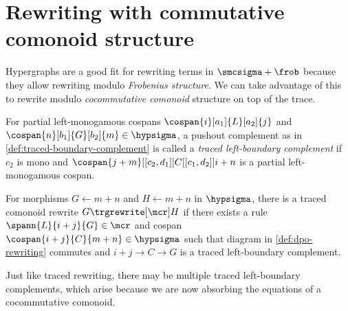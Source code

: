 \section{Rewriting with commutative comonoid structure}

Hypergraphs are a good fit for rewriting terms in
\(\smcsigma + \frob\) because they allow rewriting modulo
\emph{Frobenius structure}.
We can take advantage of this to rewrite modulo
\emph{cocommutative comonoid} structure on top of the trace.

\begin{definition}
    \label{def:traced-left-boundary-complement}
    For partial left-monogamous cospans \(
    \cospan{i}[a_1]{L}[a_2]{j}
    \) and \(
    \cospan{n}[b_1]{G}[b_2]{m} \in \hypsigma
    \), a pushout complement as in \cref{def:traced-boundary-complement}
    is called a \emph{traced left-boundary complement} if \(c_2\)
    is mono and \(
    \cospan{j + m}[[c_2,d_1]]{C}[[c_1,d_2]]{{i + n}}
    \) is a partial left-monogamous cospan.
\end{definition}

\begin{definition}
    For morphisms \(G \leftarrow m+n\) and \(H \leftarrow m+n\) in
    \(\hypsigma\), there is a traced comonoid rewrite \(G \trgrewrite[\mcr] H\)
    if there exists a rule \(
    \spann{L}{i + j}{G} \in \mcr
    \) and cospan \(
    \cospan{i + j}{C}{m + n} \in \hypsigma
    \) such that diagram in \cref{def:dpo-rewriting} commutes and
    \(i + j \to C \to G\) is a
    traced left-boundary complement.
\end{definition}

Just like traced rewriting, there may be multiple traced left-boundary
complements, which arise because we are now absorbing the equations of a
cocommutative comonoid.

